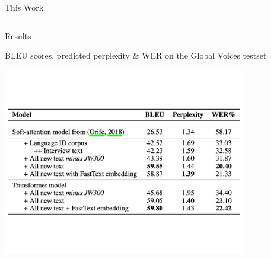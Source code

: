 \documentclass[final]{beamer}
\newlength{\twocolwid}
\begin{document}
\begin{frame}[t]
\begin{columns}[t]
\begin{column}{\twocolwid}
\begin{block}{This Work}
\begin{center}
\end{center}
\end{block}



\begin{columns}[t,totalwidth=\twocolwid] %

\begin{column}{\twocolwid} %
\begin{block}{Results}

\begin{center}
BLEU scores, predicted perplexity \& WER on the Global Voices testset

  \includegraphics[trim = 0mm 50mm 0mm 35mm, clip, width=0.80\textwidth]{figures/results.pdf}
\end{center}

\end{block}


\end{column} %




\end{columns}
\end{column}
\end{columns}
\end{frame}
\end{document}
